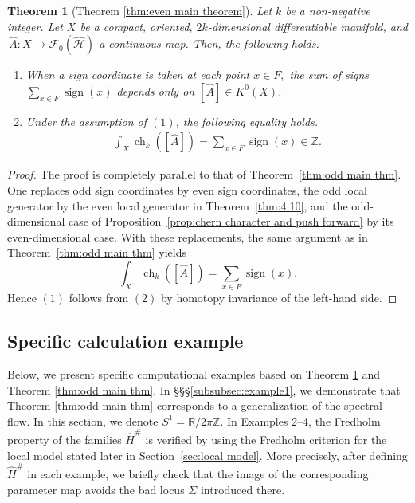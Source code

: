 \documentclass{amsart}
\newtheorem{thm}{Theorem}[section]
\theoremstyle{definition}
\theoremstyle{remark}
\begin{document}
\begin{thm}[Theorem \ref{thm:even main theorem}]\label{thm:even main thm}
Let $k$ be a non-negative integer. Let $X$ be a compact, oriented, $2k$-dimensional differentiable manifold, and \,$\hat{A}\colon X\to \mathcal{F}_{0}(\mathcal{\hat{H}})$ a continuous map. Then, the following holds.
\begin{enumerate}
\item When a sign coordinate is taken at each point $x \in F,$ the sum of signs $\sum_{x \in F}\operatorname{sign}(x)$ depends only on $[\hat{A}] \in K^0(X)$.
\item Under the assumption of $(1)$, the following equality holds.
\begin{align*}
\int_X \operatorname{ch}_{k}([\hat{A}]) = \sum_{x \in F}\operatorname{sign}(x) \in \mathbb{Z}.
\end{align*}
\end{enumerate}
\end{thm}

\begin{proof}
The proof is completely parallel to that of Theorem~\ref{thm:odd main thm}.
One replaces odd sign coordinates by even sign coordinates, the odd local generator by
the even local generator in Theorem~\ref{thm:4.10}, and the odd-dimensional case of
Proposition~\ref{prop:chern character and push forward} by its even-dimensional case.
With these replacements, the same argument as in Theorem~\ref{thm:odd main thm} yields
\[
\int_X \operatorname{ch}_{k}([\hat{A}])
=
\sum_{x\in F}\operatorname{sign}(x).
\]
Hence $(1)$ follows from $(2)$ by homotopy invariance of the left-hand side.
\end{proof}



\subsection{Specific calculation example}
\label{subsec:Specific calculation example}


Below, we present specific computational examples based on Theorem \ref{thm:even main thm} and Theorem \ref{thm:odd main thm}. In \S\S\S \ref{subsubsec:example1}, we demonstrate that Theorem \ref{thm:odd main thm} corresponds to a generalization of the spectral flow. In this section, we denote $S^1 = \mathbb{R}/2\pi \mathbb{Z}$.
In Examples 2--4, the Fredholm property of the families $\hat H^\#$ is verified by using
the Fredholm criterion for the local model stated later in Section~\ref{sec:local model}.
More precisely, after defining $\hat H^\#$ in each example, we briefly check that the image
of the corresponding parameter map avoids the bad locus $\Sigma$ introduced there.
\end{document}
